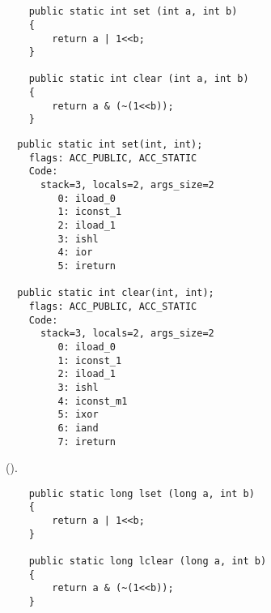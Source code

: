 \section{}


\begin{lstlisting}
	public static int set (int a, int b) 
	{
		return a | 1<<b;
	}

	public static int clear (int a, int b) 
	{
		return a & (~(1<<b));
	}
\end{lstlisting}

\begin{lstlisting}
  public static int set(int, int);
    flags: ACC_PUBLIC, ACC_STATIC
    Code:
      stack=3, locals=2, args_size=2
         0: iload_0       
         1: iconst_1      
         2: iload_1       
         3: ishl          
         4: ior           
         5: ireturn       

  public static int clear(int, int);
    flags: ACC_PUBLIC, ACC_STATIC
    Code:
      stack=3, locals=2, args_size=2
         0: iload_0       
         1: iconst_1      
         2: iload_1       
         3: ishl          
         4: iconst_m1     
         5: ixor          
         6: iand          
         7: ireturn       
\end{lstlisting}

 ().


\begin{lstlisting}
	public static long lset (long a, int b) 
	{
		return a | 1<<b;
	}

	public static long lclear (long a, int b) 
	{
		return a & (~(1<<b));
	}
\end{lstlisting}

